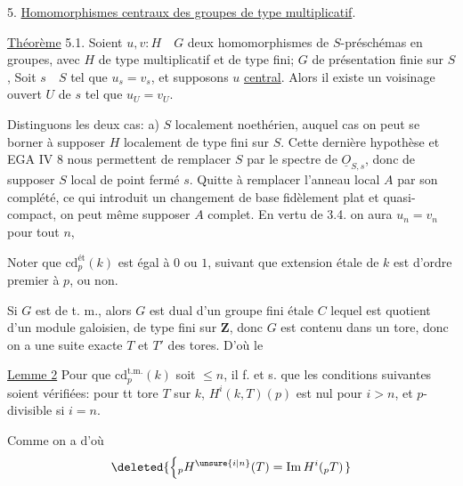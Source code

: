 5. \uline{Homomorphismes centraux des groupes de type multiplicatif}.

\uline{Théorème} 5.1. Soient $u,v:H\quad G$ deux homomorphismes de $S$-préschémas en groupes, avec $H$ de type multiplicatif et de type fini;  $G$ de présentation finie sur $S$, 
Soit $s\quad S$ tel que $u_s=v_s$, et supposons $u$ \uline{central}. Alors il existe
un voisinage ouvert $U$ de $s$ tel que $u_U=v_U$.

Distinguons les deux cas: a) $S$ localement noethérien, auquel cas
on peut se borner à supposer $H$ localement de type fini sur $S$. Cette
dernière hypothèse et EGA IV 8 nous permettent de remplacer $S$ par
le spectre de $\underline{O}_{S,s}$, donc de supposer $S$ local de point fermé $s$. Quitte
à remplacer l'anneau local $A$ par son complété, ce qui introduit un
changement de base fidèlement plat et quasi-compact, on peut même supposer $A$ complet. En vertu de 3.4. on aura $u_n=v_n$ pour tout $n$,


Noter que $\mathrm{cd}^{\text{ét}}_p(k)$ est égal à $0$ ou $1$, suivant
que  extension  étale de $k$ est d'ordre
premier à $p$, ou non.

Si $G$ est de t. m., alors $G$ est dual
d'un groupe fini étale $C$ lequel est
quotient d'un module galoisien,  de
type fini sur $\mathbf{Z}$, donc $G$ est contenu
dans un tore, donc on a une suite
exacte
$T$ et $T'$ des tores. D'où le

\uline{Lemme 2} Pour que $\mathrm{cd}^{\text{t.m.}}_p(k)$ soit $\leq n$,
\margin{$\left[\rule{0pt}{6em}\right.$}
il f. et s. que les conditions suivantes
soient vérifiées: pour tt tore $T$ sur $k$,
$H^i(k,T)(p)$ est nul pour $i>n$, et $p$-divisible
si $i=n$.
\inserted{[Ou encore: pour tte extension finie \unsure{sép.} $k'$ de $k$ [\unsure{il suffit} d'ordre premier à $p$]
\deleted{$\operatorname{Br}(k)(p)$} $H^i(k',G_m)=0$ \inserted{si $i>n$, et $H^{\unsure{n}}(k',G_m)$ est $p$-divisible}]}

Comme on a
d'où
\[
\deleted{\left\{ {}_{p}H^{\unsure{i|n}}(T)=\operatorname{Im}H^i({}_{p}T)\right.}
\]

